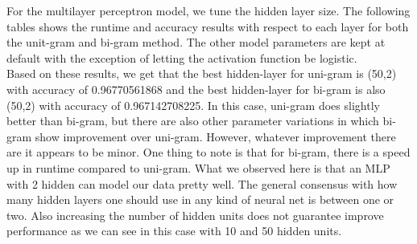 For the multilayer perceptron model, we tune the hidden layer size. The following tables shows the runtime and accuracy results with respect to each layer for both the unit-gram and bi-gram method. The other model parameters are kept at default with the exception of letting the activation function be logistic. \\

Based on these results, we get that the best hidden-layer for uni-gram is (50,2) with accuracy of 0.96770561868 and the best hidden-layer for bi-gram is also (50,2) with accuracy of 0.967142708225. In this case, uni-gram does slightly better than bi-gram, but there are also other parameter variations in which bi-gram show improvement over uni-gram. However, whatever improvement there are it appears to be minor. One thing to note is that for bi-gram, there is a speed up in runtime compared to  uni-gram. What we observed here is that an MLP with 2 hidden can model our data pretty well. The general consensus with how many hidden layers one should use in any kind of neural net is between one or two. Also increasing the number of hidden units does not guarantee improve performance as we can see in this case with 10 and 50 hidden units. \\

